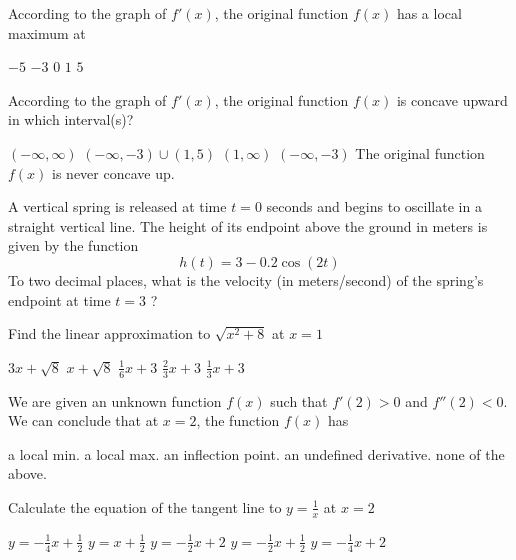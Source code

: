 \documentclass[11pt]{article}
\begin{document}
\begin{questions}
\begin{multiplechoice}{5}
\question According to the graph of $f'(x)$, the original function $f(x)$ has a local maximum at
\begin{answers}{3}
\ans $-5$
\ans $-3$
\ans $0$
\ans $1$
\ans $5$
\end{answers}


\question According to the graph of $f'(x)$, the original function $f(x)$ is concave upward in which interval(s)?
\begin{answers}{2}
\ans $(-\infty, \infty)$
\ans $(-\infty, -3) \cup (1,5)$
\ans $(1, \infty)$
\ans $(-\infty, -3)$
\ans The original function $f(x)$ is never concave up.
\end{answers}



\question A vertical spring is released at time $t = 0$ seconds and begins to oscillate in a straight vertical line.
The height of its endpoint above the ground in meters is given by the function
$$h(t) = 3 - 0.2\cos(2t)$$
To two decimal places, what is the velocity (in meters/second) of the spring's endpoint at time $t = 3$ ?
\begin{answers}{3}
\end{answers}

\newpage

\question Find the linear approximation to $\sqrt{x^2+8}$ at $x = 1$
\begin{answers}{2}
\ans $3x + \sqrt{8}$
\ans $x + \sqrt{8}$
\ans $\frac{1}{6} x + 3$
\ans $\frac{2}{3}x + 3$
\ans $\frac{1}{3} x + 3$
\end{answers}


\question We are given an unknown function $f(x)$ such that $f'(2) > 0$ and $f''(2) < 0$.
We can conclude that at $x = 2$, the function $f(x)$ has 
\begin{answers}{2}
\ans a local min.
\ans a local max.
\ans an inflection point.
\ans an undefined derivative.
\ans none of the above.
\end{answers}

\question Calculate the equation of the tangent line to $y = \frac{1}{x}$ at $x = 2$
\begin{answers}{2}
\ans $y = -\frac{1}{4}x + \frac{1}{2}$
\ans $y = x + \frac{1}{2}$
\ans $y = -\frac{1}{2}x + 2$
\ans $y = -\frac{1}{2}x + \frac{1}{2}$
\ans $y = -\frac{1}{4}x + 2$
\end{answers}








\end{multiplechoice}
\end{questions}
\end{document}
